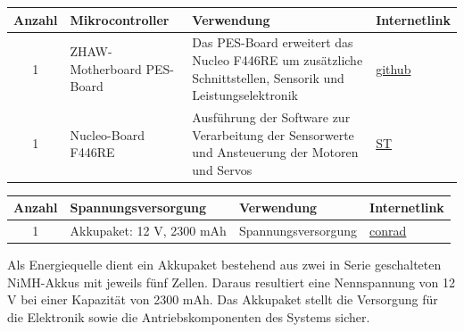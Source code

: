 \documentclass[11pt,a4paper]{article}
\renewcommand{\arraystretch}{1.7}
\begin{document}
	\begin{table}[H]
		\centering
		\renewcommand{\arraystretch}{1.2}
		\begin{tabularx}{\textwidth}{|c|l|X|p{2.5cm}|}
			\hline
			\textbf{Anzahl} & \textbf{Mikrocontroller} & \textbf{Verwendung} & \textbf{Internetlink} 
			\\
			\hline
			1& %
			ZHAW-Motherboard PES-Board& %
			Das PES-Board erweitert das Nucleo F446RE um zusätzliche Schnittstellen, Sensorik und Leistungselektronik& %
			\href{https://github.com/ZHAW-PM-2-ADHS/ADHS}{github} \cite{pes-board} \\
			\hline
			1& %
			Nucleo-Board F446RE& %
			Ausführung der Software zur Verarbeitung der Sensorwerte und Ansteuerung der Motoren und Servos& %
			\href{https://www.st.com/en/evaluation-tools/nucleo-f446re.html}{ST} \cite{nucleo-f446re} \\
			\hline
			
		\end{tabularx}
	\end{table}
	
	\begin{table}[H]
		\centering
		\renewcommand{\arraystretch}{1.2}
		\begin{tabularx}{\textwidth}{|c|l|X|p{2.5cm}|}
			\hline
			\textbf{Anzahl} & \textbf{Spannungsversorgung} & \textbf{Verwendung} & \textbf{Internetlink} 
			\\
			\hline
			1& %
			Akkupaket: 12 V, 2300 mAh& %
			Spannungsversorgung& %
			\href{https://www.conrad.ch/de/p/reely-modellbau-akkupack-nimh-6-v-2300-mah-zellen-zahl-5-mignon-aa-side-by-side-jr-buchse-2613252.html}{conrad} \cite{akku-nimh} \\
			\hline
			
		\end{tabularx}
	\end{table}
	Als Energiequelle dient ein Akkupaket bestehend aus zwei in Serie geschalteten NiMH-Akkus mit jeweils fünf Zellen. Daraus resultiert eine Nennspannung von 12 V bei einer Kapazität von 2300 mAh. Das Akkupaket stellt die Versorgung für die Elektronik sowie die Antriebskomponenten des Systems sicher.
	
	
\end{document}

